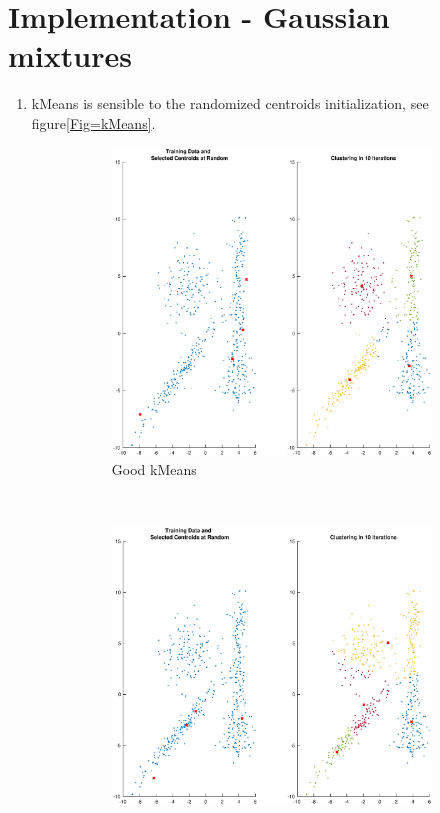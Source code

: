\documentclass[a4paper,10pt]{article}
\begin{document}
\newpage
\section{Implementation - Gaussian mixtures}

\begin{enumerate}[label=(\alph*)]
\item kMeans is sensible to the randomized centroids initialization, see figure\ref{Fig=kMeans}. 

\begin{figure}[h!]
    \centering
    \begin{subfigure}[t]{0.5\textwidth}
        \centering
       \includegraphics[width=\linewidth]{classification_data_HWK2/goodKMeans.eps} 
        \caption{Good kMeans}
    \end{subfigure}%
    ~ 
    \begin{subfigure}[t]{0.5\textwidth}
        \centering
        \includegraphics[width=\linewidth]{classification_data_HWK2/badKMeans.eps} 

\end{subfigure}
\end{figure}
\end{enumerate}
\end{document}
